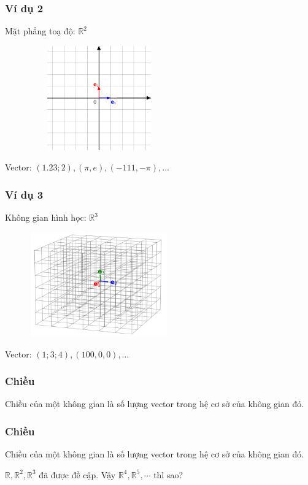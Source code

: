 \begin{frame}
    \frametitle{Ví dụ 2}
    Mặt phẳng toạ độ: \(\mathbb{R}^2\)
    \begin{figure}[H]
        \centering
        \includegraphics[width=6cm, height=4.5cm]{Slides/Figure/2Dvectorspace.png}
    \end{figure}
    Vector: \((1.23;2),(\pi, e),(-111,-\pi),\dots\)
\end{frame}
\begin{frame}
    \frametitle{Ví dụ 3}
    Không gian hình học: \(\mathbb{R}^3\)
    \begin{figure}[H]
        \centering
        \includegraphics[width=6cm, height=4.5cm]{Slides/Figure/3Dvectorspace.png}
    \end{figure}
    Vector: \((1;3;4),(100,0,0),\dots\)
\end{frame}
\begin{frame}
    \frametitle{Chiều}
    \begin{tcolorbox}[colback=blue!10!, colframe=blue!50!black, title=Chiều của không gian vector]
        Chiều của một không gian là số lượng vector trong hệ cơ sở của không gian đó.
    \end{tcolorbox}
    
\end{frame}
\begin{frame}
    \frametitle{Chiều}
    \begin{tcolorbox}[colback=blue!10!, colframe=blue!50!black, title=Chiều của không gian vector]
        Chiều của một không gian là số lượng vector trong hệ cơ sở của không gian đó.
    \end{tcolorbox}
    \(\mathbb{R}, \mathbb{R}^2 ,\mathbb{R}^3\) đã được đề cập. Vậy \(\mathbb{R}^4, \mathbb{R}^5 ,\cdots\) thì sao?
\end{frame}
